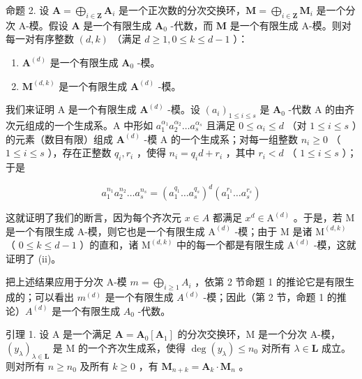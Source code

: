 命题 2. 设 \(\mathbf{A} = \bigoplus_{i\in \mathbf{Z}}\mathbf{A}_i\) 是一个正次数的分次交换环，\(\mathbf{M} = \bigoplus_{i\in \mathbf{Z}}\mathbf{M}_i\) 是一个分次 A-模。假设 \(\mathbf{A}\) 是一个有限生成 \(\mathbf{A}_0\) -代数，而 \(\mathbf{M}\) 是一个有限生成 A-模。则对每一对有序整数 \((d,k)\) （满足 \(d\geqslant 1,0\leqslant k\leqslant d - 1\) ）：

\begin{enumerate}
\def\labelenumi{(\roman{enumi})}
\item
  \(\mathbf{A}^{(d)}\) 是一个有限生成 \(\mathbf{A}_0\) -模。
\item
  \(\mathbf{M}^{(d,k)}\) 是一个有限生成 \(\mathbf{A}^{(d)}\) -模。
\end{enumerate}

我们来证明 A 是一个有限生成 \(\mathbf{A}^{(d)}\) -模。设 \((a_{i})_{1\leqslant i\leqslant s}\) 是 \(\mathbf{A}_0\) -代数 A 的由齐次元组成的一个生成系。A 中形如 \(a_1^{\alpha_1}a_2^{\alpha_2}\ldots a_s^{\alpha_s}\) 且满足 \(0\leqslant \alpha_{i}\leqslant d\) （对 \(1\leqslant i\leqslant s\) ）的元素（数目有限）组成 \(\mathbf{A}^{(d)}\) -模 A 的一个生成系；对每一组整数 \(n_i\geqslant 0\) （ \(1\leqslant i\leqslant s\) ），存在正整数 \(q_{i}, r_{i}\) ，使得 \(n_i = q_id + r_i\) ，其中 \(r_i < d\) （ \(1\leqslant i\leqslant s\) ）；于是

\[
a _ {1} ^ {n _ {1}} a _ {2} ^ {n _ {2}} \dots a _ {s} ^ {n _ {s}} = (a _ {1} ^ {q _ {1}} \dots a _ {s} ^ {q _ {s}}) ^ {d} (a _ {1} ^ {r _ {1}} \dots a _ {s} ^ {r _ {s}})
\]

这就证明了我们的断言，因为每个齐次元 \(x \in A\) 都满足 \(x^{d} \in \mathrm{A}^{(d)}\) 。于是，若 M 是一个有限生成 A-模，则它也是一个有限生成 \(\mathrm{A}^{(d)}\) -模；由于 M 是诸 \(\mathrm{M}^{(d,k)}\) （ \(0 \leqslant k \leqslant d - 1\) ）的直和，诸 \(\mathrm{M}^{(d,k)}\) 中的每一个都是有限生成 \(\mathrm{A}^{(d)}\) -模，这就证明了 (ii)。

把上述结果应用于分次 A-模 \(m = \bigoplus_{i \geqslant 1} A_i\) ，依第 2 节命题 1 的推论它是有限生成的；可以看出 \(m^{(d)}\) 是一个有限生成 \(A^{(d)}\) -模；因此（第 2 节，命题 1 的推论）\(A^{(d)}\) 是一个有限生成 \(A_0\) -代数。

引理 1. 设 A 是一个满足 \(\mathbf{A} = \mathbf{A}_0[\mathbf{A}_1]\) 的分次交换环，M 是一个分次 A-模，\((y_{\lambda})_{\lambda \in \mathbf{L}}\) 是 M 的一个齐次生成系，使得 \(\deg(y_{\lambda}) \leqslant n_0\) 对所有 \(\lambda \in \mathbf{L}\) 成立。则对所有 \(n \geqslant n_0\) 及所有 \(k \geqslant 0\) ，有 \(\mathbf{M}_{n+k} = \mathbf{A}_k \cdot \mathbf{M}_n\) 。

